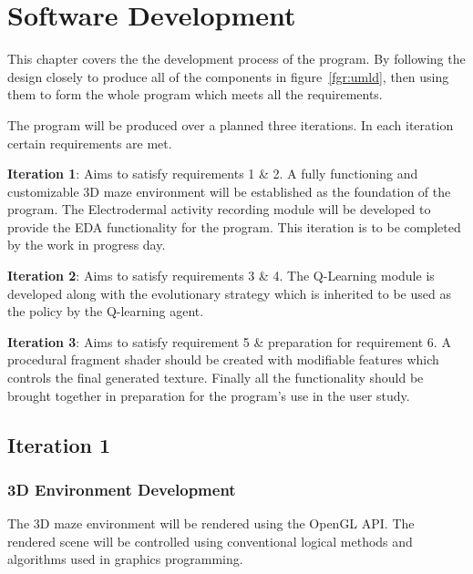 \documentclass{report}
\begin{document}
\chapter{Software Development}

This chapter covers the the development process of the program. By following the design closely to produce all of the components in figure~\ref{fgr:umld}, then using them to
form the whole program which meets all the requirements.

The program will be produced over a planned three iterations. In each iteration certain requirements are met.

\noindent \textbf{Iteration 1}: Aims to satisfy requirements 1 \& 2. A fully functioning and customizable 3D maze environment will be established as the foundation of the program.
The Electrodermal activity recording module will be developed to provide the EDA functionality for the program. This iteration is to be completed by the work in progress day.

\noindent \textbf{Iteration 2}: Aims to satisfy requirements 3 \& 4. The Q-Learning module is developed along with the evolutionary strategy which is inherited to be used as the policy by the Q-learning agent.

\noindent \textbf{Iteration 3}: Aims to satisfy requirement 5 \& preparation for requirement 6. A procedural fragment shader should be created with modifiable features which 
controls the final generated texture. Finally all the functionality should be brought together in preparation for the program's use in the user study.

\section{Iteration 1}

\subsection{3D Environment Development}

The 3D maze environment will be rendered using the OpenGL API. The rendered scene will be controlled using conventional logical methods and algorithms used in 
graphics programming.
\end{document}
